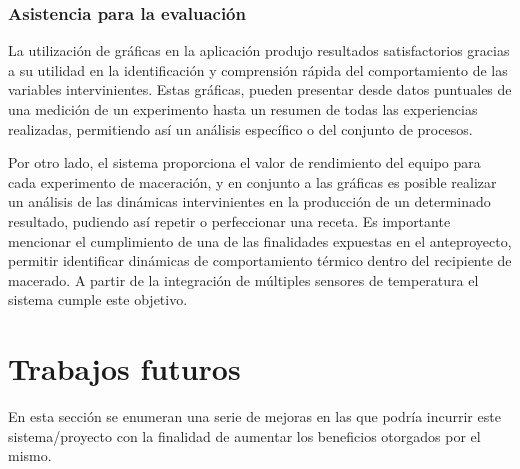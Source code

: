 \subsubsection{Asistencia para la evaluación}  
\par La utilización de gráficas en la aplicación produjo resultados satisfactorios gracias a su utilidad en la identificación y comprensión rápida del comportamiento de las variables intervinientes. Estas gráficas, pueden presentar desde datos puntuales de una medición de un experimento hasta un resumen de todas las experiencias realizadas, permitiendo así un análisis específico o del conjunto de procesos.

\par Por otro lado, el sistema proporciona el valor de rendimiento del equipo para cada experimento de maceración, y en conjunto a las gráficas es posible realizar un análisis de las dinámicas intervinientes en la producción de un determinado resultado, pudiendo así repetir o perfeccionar una receta.
Es importante mencionar el cumplimiento de una de las finalidades expuestas en el anteproyecto, permitir identificar dinámicas de comportamiento térmico dentro del recipiente de macerado. A partir de la integración de múltiples sensores de temperatura el sistema cumple este objetivo.

\section{Trabajos futuros} %
\par En esta sección se enumeran una serie de mejoras en las que podría incurrir este sistema/proyecto con la finalidad de aumentar los beneficios otorgados por el mismo.

